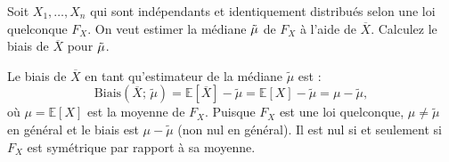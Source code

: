 \begin{questions}
\begin{parts}
\end{parts}

\question[8] Soit $X_1,\hdots,X_n$ qui sont indépendants et identiquement distribués selon une loi quelconque $F_X$. 
On veut estimer la médiane $\Tilde{\mu}$ de $F_X$ à l'aide de $\overline{X}$.
Calculez le biais de $\overline{X}$ pour $\Tilde{\mu}$.

\begin{solution}
Le biais de $\overline{X}$ en tant qu'estimateur de la médiane $\tilde{\mu}$ est :
$$\text{Biais}(\overline{X};\,\tilde{\mu})=\mathbb{E}[\overline{X}]-\tilde{\mu}=\mathbb{E}[X]-\tilde{\mu}=\mu-\tilde{\mu},$$
o\`u $\mu=\mathbb{E}[X]$ est la moyenne de $F_X$. Puisque $F_X$ est une loi quelconque, $\mu\neq\tilde{\mu}$ en général et le biais est $\mu-\tilde{\mu}$ (non nul en général). Il est nul si et seulement si $F_X$ est symétrique par rapport à sa moyenne.
\end{solution}

\end{questions}
\pageblanche
 
